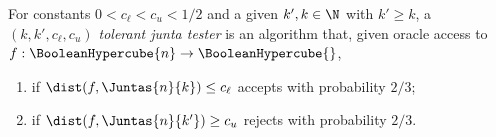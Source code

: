 \begin{definition}
\label{definition:tolerant-junta-testing}

For constants $0 < c_\ell < c_u < 1/2$ and a given $k',k\in \N$ with $k'\geq k$, a \emph{$(k, k', c_\ell, c_u)$ tolerant junta tester} is an algorithm that, given oracle access to $f: \BooleanHypercube{n} \to \BooleanHypercube{}$, 
\begin{enumerate}
    \item if $\dist(f, \Juntas{n}{k}) \leq c_\ell$ accepts with probability $2/3$;
    \item if $\dist(f, \Juntas{n}{k'}) \geq c_u$ rejects with probability $2/3$.
\end{enumerate}
\end{definition}
\begin{figure}
    \centering



\begin{tikzpicture}[x=0.75pt,y=0.75pt,yscale=-1,xscale=1]


\end{tikzpicture}
\end{figure}
